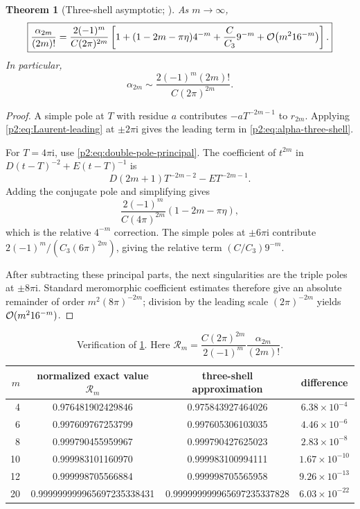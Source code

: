 \documentclass[11pt,oneside]{article}
\numberwithin{equation}{section}
\newtheorem{theorem}{Theorem}[section]
\theoremstyle{definition}
\theoremstyle{remark}
\newcommand{\ii}{\mathrm i}
\begin{document}
\begin{theorem}[Three-shell asymptotic; \statusnew]
\label{p2:thm:three-shell}
As $m\to\infty$,
\begin{equation}
 \boxed{
 \frac{\alpha_{2m}}{(2m)!}
 =\frac{2(-1)^m}{C(2\pi)^{2m}}
 \left[
 1+(1-2m-\pi\eta)4^{-m}
 +\frac{C}{C_3}9^{-m}
 +\mathcal O\!\left(m^2 16^{-m}\right)
 \right].
 }
 \label{p2:eq:alpha-three-shell}
\end{equation}
In particular,
\begin{equation}
 \alpha_{2m}
 \sim \frac{2(-1)^m(2m)!}{C(2\pi)^{2m}}.
 \label{p2:eq:alpha-leading-asymptotic}
\end{equation}
\end{theorem}

\begin{proof}
A simple pole at $T$ with residue $a$ contributes $-aT^{-2m-1}$ to $r_{2m}$.  Applying
\eqref{p2:eq:Laurent-leading} at $\pm2\pi\ii$ gives the leading term in
\eqref{p2:eq:alpha-three-shell}.

For $T=4\pi\ii$, use \eqref{p2:eq:double-pole-principal}.  The coefficient of $t^{2m}$ in
$D(t-T)^{-2}+E(t-T)^{-1}$ is
\[
 D(2m+1)T^{-2m-2}-ET^{-2m-1}.
\]
Adding the conjugate pole and simplifying gives
\[
 \frac{2(-1)^m}{C(4\pi)^{2m}}(1-2m-\pi\eta),
\]
which is the relative $4^{-m}$ correction.  The simple poles at $\pm6\pi\ii$ contribute
$2(-1)^m/(C_3(6\pi)^{2m})$, giving the relative term $(C/C_3)9^{-m}$.

After subtracting these principal parts, the next singularities are the triple poles at
$\pm8\pi\ii$.  Standard meromorphic coefficient estimates therefore give an absolute remainder
of order $m^2(8\pi)^{-2m}$; division by the leading scale $(2\pi)^{-2m}$ yields
$\mathcal O(m^2 16^{-m})$.
\end{proof}

\begin{table}[htbp]
\centering
\small
\begin{tabular}{@{}rccc@{}}
\toprule
$m$ & normalized exact value $\mathcal R_m$ & three-shell approximation & difference \\
\midrule
4  & 0.976481902429846 & 0.975843927464026 & $6.38\times10^{-4}$ \\
6  & 0.997609767253799 & 0.997605306103035 & $4.46\times10^{-6}$ \\
8  & 0.999790455959967 & 0.999790427625023 & $2.83\times10^{-8}$ \\
10 & 0.999983101160970 & 0.999983100994111 & $1.67\times10^{-10}$ \\
12 & 0.999998705566884 & 0.999998705565958 & $9.26\times10^{-13}$ \\
20 & 0.999999999965697235338431 & 0.999999999965697235337828 & $6.03\times10^{-22}$ \\
\bottomrule
\end{tabular}
\caption{Verification of \cref{p2:thm:three-shell}.  Here
$\mathcal R_m=\dfrac{C(2\pi)^{2m}}{2(-1)^m}\dfrac{\alpha_{2m}}{(2m)!}$.}
\label{p2:tab:three-shell}
\end{table}
\end{document}
